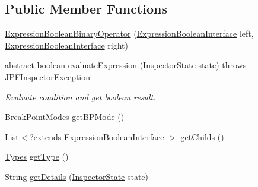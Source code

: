\subsection*{Public Member Functions}
\begin{DoxyCompactItemize}
\item 
\hyperlink{classgov_1_1nasa_1_1jpf_1_1inspector_1_1server_1_1expression_1_1_expression_boolean_binary_operator_a5440b8b71084df93afd440b47a02da52}{Expression\+Boolean\+Binary\+Operator} (\hyperlink{interfacegov_1_1nasa_1_1jpf_1_1inspector_1_1server_1_1expression_1_1_expression_boolean_interface}{Expression\+Boolean\+Interface} left, \hyperlink{interfacegov_1_1nasa_1_1jpf_1_1inspector_1_1server_1_1expression_1_1_expression_boolean_interface}{Expression\+Boolean\+Interface} right)
\item 
abstract boolean \hyperlink{classgov_1_1nasa_1_1jpf_1_1inspector_1_1server_1_1expression_1_1_expression_boolean_binary_operator_a0e5c542963babe959ddfb63b56bd8324}{evaluate\+Expression} (\hyperlink{interfacegov_1_1nasa_1_1jpf_1_1inspector_1_1server_1_1expression_1_1_inspector_state}{Inspector\+State} state)  throws J\+P\+F\+Inspector\+Exception
\begin{DoxyCompactList}\small\item\em Evaluate condition and get boolean result. \end{DoxyCompactList}\item 
\hyperlink{enumgov_1_1nasa_1_1jpf_1_1inspector_1_1server_1_1breakpoints_1_1_break_point_modes}{Break\+Point\+Modes} \hyperlink{classgov_1_1nasa_1_1jpf_1_1inspector_1_1server_1_1expression_1_1_expression_boolean_binary_operator_a7ef59a2108ddded0cc7094ae1e3086d7}{get\+B\+P\+Mode} ()
\item 
List$<$?extends \hyperlink{interfacegov_1_1nasa_1_1jpf_1_1inspector_1_1server_1_1expression_1_1_expression_boolean_interface}{Expression\+Boolean\+Interface} $>$ \hyperlink{classgov_1_1nasa_1_1jpf_1_1inspector_1_1server_1_1expression_1_1_expression_boolean_binary_operator_a8cf5fe32bcd0cd345799ea65905beac3}{get\+Childs} ()
\item 
\hyperlink{enumgov_1_1nasa_1_1jpf_1_1inspector_1_1server_1_1expression_1_1_types}{Types} \hyperlink{classgov_1_1nasa_1_1jpf_1_1inspector_1_1server_1_1expression_1_1_expression_boolean_aed010ff8683eb1e8621e226703133457}{get\+Type} ()
\item 
String \hyperlink{classgov_1_1nasa_1_1jpf_1_1inspector_1_1server_1_1expression_1_1_expression_boolean_a43423e204404f24bf7862de938598eb7}{get\+Details} (\hyperlink{interfacegov_1_1nasa_1_1jpf_1_1inspector_1_1server_1_1expression_1_1_inspector_state}{Inspector\+State} state)

\end{DoxyCompactItemize}
